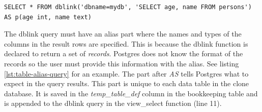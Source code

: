 \begin{lstlisting}[caption={An example of a SELECT query with a table alias},label={lst:table-alias-query}]
SELECT * FROM dblink('dbname=mydb', 'SELECT age, name FROM persons') AS p(age int, name text)
\end{lstlisting}

The dblink query must have an alias part where the names and types of the columns in the result rows are specified.
This is because the dblink function is declared to return a set of \textit{records}.
Postgres does not know the format of the records so the user must provide this information with the alias.
See listing \ref{lst:table-alias-query} for an example.
The part after \textit{AS} tells Postgres what to expect in the query results.
This part is unique to each data table in the clone database.
It is saved in the \textit{temp\_table\_def} column in the bookkeeping table and is appended to the dblink query in the view\_select function (line 11).